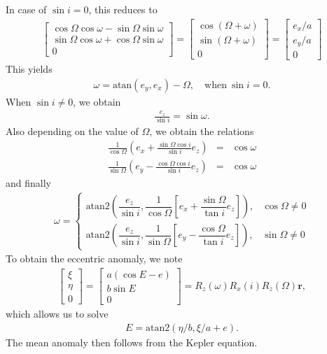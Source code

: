 \documentclass [12pt, a4paper] {article}
\newcommand{\vc}[1]
{
	\boldsymbol{#1}
}
\begin{document}
In case of $\sin i=0$, this reduces to 
\begin {eqnarray}
  \begin {bmatrix}
    \cos\Omega\cos\omega - \sin\Omega\sin\omega \\ 
    \sin\Omega\cos\omega + \cos\Omega\sin\omega \\ 
    0
  \end {bmatrix}
  =
  \begin {bmatrix}
    \cos(\Omega + \omega) \\
    \sin(\Omega + \omega) \\
    0
  \end {bmatrix}
  = 
  \begin {bmatrix}
    e_x/a \\ 
    e_y/a \\
    0
  \end {bmatrix}
\end {eqnarray}
This yields 
\begin {eqnarray}
  \omega = \textrm{atan}(e_y, e_x) - \Omega, \quad \textrm{when} \: \sin i = 0.
\end {eqnarray}
When $\sin i\neq 0$, we obtain 
\begin {eqnarray}
  \frac{e_z}{\sin i} = \sin\omega.
\end {eqnarray}
Also depending on the value of $\Omega$, we obtain the relations 
\begin {eqnarray}
  \frac{1}{\cos\Omega}\left(
    e_x + \frac{\sin\Omega\cos i}{\sin i}e_z 
  \right)
  &=& \cos\omega \\ 
  \frac{1}{\sin\Omega}\left(
    e_y - \frac{\cos\Omega\cos i}{\sin i}e_z
  \right)
  &=&  \cos\omega
\end {eqnarray}
and finally 
\begin {eqnarray}
  \omega = 
  \left\{
    \begin {array}{rr}
    \textrm{atan2}\left(\dfrac{e_z}{\sin i}, 
    \dfrac{1}{\cos\Omega}\left[e_x + \dfrac{\sin\Omega}{\tan i}e_z\right]
    \right), & \cos\Omega\neq 0 
    \\
    \textrm{atan2}\left(\dfrac{e_z}{\sin i}, 
    \dfrac{1}{\sin\Omega}\left[e_y - \dfrac{\cos\Omega}{\tan i}e_z\right]
    \right), & \sin\Omega\neq 0 
    \end {array}
  \right.
\end {eqnarray}
To obtain the eccentric anomaly, we note 
\begin {eqnarray}
  \begin {bmatrix}
    \xi \\ \eta \\ 0 
  \end {bmatrix}
  =
  \begin {bmatrix}
    a(\cos E - e) \\ b\sin E \\ 0
  \end {bmatrix}
  =
  R_z(\omega)R_x(i)R_z(\Omega)\vc r,
\end {eqnarray}
which allows us to solve 
\begin {eqnarray}
  E = \textrm{atan2}(\eta/b, \xi/a + e).
\end {eqnarray}
The mean anomaly then follows from the Kepler equation.
\end{document}
